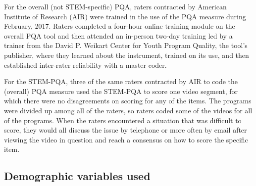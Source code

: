 \documentclass[]{msu-thesis}
\theoremstyle{definition}
\theoremstyle{definition}
\theoremstyle{definition}
\theoremstyle{remark}
\begin{document}
\begin{table}

\caption{\label{tab:unnamed-chunk-6}Coding Frame for Work With Data}
\centering
{}
\end{table}

For the overall (not STEM-specific) PQA, raters contracted by American
Institute of Research (AIR) were trained in the use of the PQA measure
during February, 2017. Raters completed a four-hour online training
module on the overall PQA tool and then attended an in-person two-day
training led by a trainer from the David P. Weikart Center for Youth
Program Quality, the tool's publisher, where they learned about the
instrument, trained on its use, and then established inter-rater
reliability with a master coder.

For the STEM-PQA, three of the same raters contracted by AIR to code the
(overall) PQA measure used the STEM-PQA to score one video segment, for
which there were no disagreements on scoring for any of the items. The
programs were divided up among all of the raters, so raters coded some
of the videos for all of the programs. When the raters encountered a
situation that was difficult to score, they would all discuss the issue
by telephone or more often by email after viewing the video in question
and reach a consensus on how to score the specific item.

\subsection{Demographic variables
used}\label{demographic-variables-used}
\end{document}
